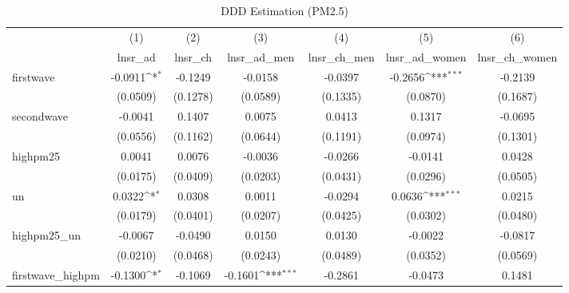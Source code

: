\begin{table}[htbp]\centering
\def\sym#1{\ifmmode^{#1}\else\(^{#1}\)\fi}
\caption{DDD Estimation (PM2.5)}
\begin{tabular}{l*{6}{c}}
\hline\hline
            &\multicolumn{1}{c}{(1)}&\multicolumn{1}{c}{(2)}&\multicolumn{1}{c}{(3)}&\multicolumn{1}{c}{(4)}&\multicolumn{1}{c}{(5)}&\multicolumn{1}{c}{(6)}\\
            &\multicolumn{1}{c}{lnsr\_ad}&\multicolumn{1}{c}{lnsr\_ch}&\multicolumn{1}{c}{lnsr\_ad\_men}&\multicolumn{1}{c}{lnsr\_ch\_men}&\multicolumn{1}{c}{lnsr\_ad\_women}&\multicolumn{1}{c}{lnsr\_ch\_women}\\
\hline
firstwave   &     -0.0911\sym{*}  &     -0.1249         &     -0.0158         &     -0.0397         &     -0.2656\sym{***}&     -0.2139         \\
            &    (0.0509)         &    (0.1278)         &    (0.0589)         &    (0.1335)         &    (0.0870)         &    (0.1687)         \\
[1em]
secondwave  &     -0.0041         &      0.1407         &      0.0075         &      0.0413         &      0.1317         &     -0.0695         \\
            &    (0.0556)         &    (0.1162)         &    (0.0644)         &    (0.1191)         &    (0.0974)         &    (0.1301)         \\
[1em]
highpm25    &      0.0041         &      0.0076         &     -0.0036         &     -0.0266         &     -0.0141         &      0.0428         \\
            &    (0.0175)         &    (0.0409)         &    (0.0203)         &    (0.0431)         &    (0.0296)         &    (0.0505)         \\
[1em]
un          &      0.0322\sym{*}  &      0.0308         &      0.0011         &     -0.0294         &      0.0636\sym{***}&      0.0215         \\
            &    (0.0179)         &    (0.0401)         &    (0.0207)         &    (0.0425)         &    (0.0302)         &    (0.0480)         \\
[1em]
highpm25\_un &     -0.0067         &     -0.0490         &      0.0150         &      0.0130         &     -0.0022         &     -0.0817         \\
            &    (0.0210)         &    (0.0468)         &    (0.0243)         &    (0.0489)         &    (0.0352)         &    (0.0569)         \\
[1em]
firstwave\_highpm&     -0.1300\sym{*}  &     -0.1069         &     -0.1601\sym{***}&     -0.2861         &     -0.0473         &      0.1481         \\

\end{tabular}
\end{table}

